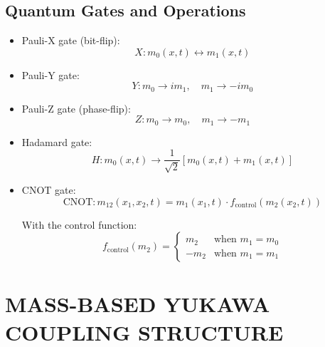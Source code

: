 \documentclass[12pt,a4paper]{article}
\begin{document}
	\subsection{Quantum Gates and Operations}
	\begin{itemize}
		\item Pauli-X gate (bit-flip):
		\begin{equation}
			X: m_0(x,t) \leftrightarrow m_1(x,t)
		\end{equation}
		
		\item Pauli-Y gate:
		\begin{equation}
			Y: m_0 \rightarrow im_1, \quad m_1 \rightarrow -im_0
		\end{equation}
		
		\item Pauli-Z gate (phase-flip):
		\begin{equation}
			Z: m_0 \rightarrow m_0, \quad m_1 \rightarrow -m_1
		\end{equation}
		
		\item Hadamard gate:
		\begin{equation}
			H: m_0(x,t) \rightarrow \frac{1}{\sqrt{2}}[m_0(x,t) + m_1(x,t)]
		\end{equation}
		
		\item CNOT gate:
		\begin{equation}
			\text{CNOT}: m_{12}(x_1,x_2,t) = m_1(x_1,t) \cdot f_{\text{control}}(m_2(x_2,t))
		\end{equation}
		
		With the control function:
		\begin{equation}
			f_{\text{control}}(m_2) = 
			\begin{cases}
				m_2 & \text{when } m_1 = m_0 \\
				-m_2 & \text{when } m_1 = m_1
			\end{cases}
		\end{equation}
	\end{itemize}

\section{MASS-BASED YUKAWA COUPLING STRUCTURE}
\end{document}
